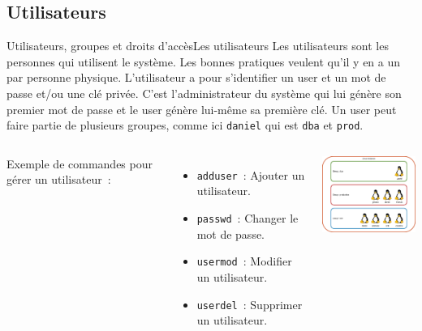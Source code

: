 \documentclass{beamer}
\begin{document}
    \subsection{Utilisateurs}\label{subsec:utilisateurs}
    \begin{frame}{Utilisateurs, groupes et droits d'accès}{Les utilisateurs}
        Les utilisateurs sont les personnes qui utilisent le système.
        Les bonnes pratiques veulent qu'il y en a un par personne physique.
        L'utilisateur a pour s'identifier un user et un mot de passe et/ou une clé privée.
        C'est l'administrateur du système qui lui génère son premier mot de passe et le user génère lui-même sa première clé.
        Un user peut faire partie de plusieurs groupes, comme ici \lstinline{daniel} qui est \lstinline{dba} et \lstinline{prod}.
        \bigbreak
        \begin{columns}
            Exemple de commandes pour gérer un utilisateur~:
            \begin{itemize}
                \item \lstinline{adduser}~: Ajouter un utilisateur.
                \item \lstinline{passwd}~: Changer le mot de passe.
                \item \lstinline{usermod}~: Modifier un utilisateur.
                \item \lstinline{userdel}~: Supprimer un utilisateur.
            \end{itemize}
            \centering
            \includegraphics[width=5cm]{image/groups-and-users.drawio}
        \end{columns}
    \end{frame}
\end{document}
